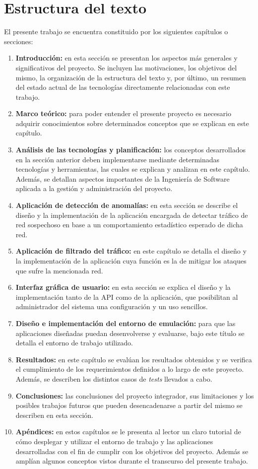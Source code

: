 \section {Estructura del texto}
El presente trabajo se encuentra constituido por los siguientes capítulos o secciones:
\begin{enumerate}
\item \textbf {Introducción:} en esta sección se presentan los aspectos más generales y significativos del proyecto. Se incluyen las motivaciones, los objetivos del mismo, la organización de la estructura del texto y, por último, un resumen del estado actual de las tecnologías directamente relacionadas con este trabajo.

\item \textbf {Marco teórico:} para poder entender el presente proyecto es
  necesario adquirir conocimientos sobre determinados conceptos que se explican en
  este capítulo.
\item \textbf {Análisis de las tecnologías y planificación:} los conceptos
  desarrollados en la sección anterior deben implementarse mediante determinadas
  tecnologías y herramientas, las cuales se explican y analizan en este
  capítulo. Además, se detallan aspectos importantes de la Ingeniería de
  Software aplicada a la gestión y administración del proyecto.
\item \textbf {Aplicación de detección de anomalías:} en esta sección se describe
  el diseño y la implementación de la aplicación encargada de detectar tráfico
  de red sospechoso en base a un comportamiento estadístico esperado de dicha
  red.
\item \textbf {Aplicación de filtrado del tráfico:} en este capítulo se detalla el diseño y la implementación de la aplicación cuya función es la de mitigar los ataques que sufre la mencionada red.
\item \textbf {Interfaz gráfica de usuario:} en esta sección se explica el
  diseño y la implementación tanto de la API como de la aplicación, que
  posibilitan al administrador del sistema una configuración y un uso sencillos.
\item \textbf {Diseño e implementación del entorno de emulación:} para que las aplicaciones diseñadas puedan desenvolverse y evaluarse, bajo este título se detalla el entorno de trabajo utilizado.
\item \textbf {Resultados:} en este capítulo se evalúan los resultados obtenidos
  y se verifica el cumplimiento de los requerimientos definidos a lo largo de este
  proyecto. Además, se describen los distintos casos de \textit{tests} llevados a cabo.
\item \textbf {Conclusiones:} las conclusiones del proyecto integrador, sus limitaciones
  y los posibles trabajos futuros que pueden desencadenarse a partir del mismo se
  describen en esta sección.
\item \textbf {Apéndices:} en estos capítulos se le presenta al lector un claro
  tutorial de cómo desplegar y utilizar el entorno de trabajo y las aplicaciones
  desarrolladas con el fin de cumplir con los objetivos del proyecto. Además se
  amplían algunos conceptos vistos durante el transcurso del presente trabajo.
  

\end{enumerate}
